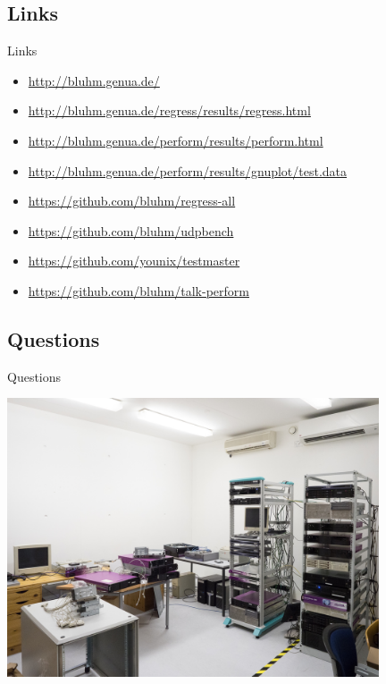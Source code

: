 \documentclass[14pt,aspectratio=169]{beamer}
\begin{document}
\subsection{Links}
\begin{frame}{Links}
\begin{itemize}
    \small
    \item \url{http://bluhm.genua.de/}
    \item \url{http://bluhm.genua.de/regress/results/regress.html}
    \item \url{http://bluhm.genua.de/perform/results/perform.html}
    \item \url{http://bluhm.genua.de/perform/results/gnuplot/test.data}
    \item \url{https://github.com/bluhm/regress-all}
    \item \url{https://github.com/bluhm/udpbench}
    \item \url{https://github.com/younix/testmaster}
    \item \url{https://github.com/bluhm/talk-perform}
\end{itemize}
\end{frame}

\subsection{Questions}
\begin{frame}{Questions}
\begin{center}
    \includegraphics[width=11cm,trim=0 0 0 3cm,clip]
	{images/obsd-vortrag-4.jpg}
\end{center}
\end{frame}
\end{document}
